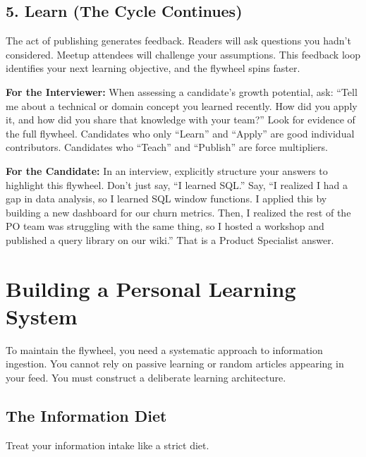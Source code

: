 \documentclass[
  11pt,
  openany,
  oneside]{book}
\renewenvironment{quote}{\begin{customquote}}{\end{customquote}}
\begin{document}
\subsection{5. Learn (The Cycle
Continues)}\label{learn-the-cycle-continues}

The act of publishing generates feedback. Readers will ask questions you
hadn't considered. Meetup attendees will challenge your assumptions.
This feedback loop identifies your next learning objective, and the
flywheel spins faster.

\begin{quote}
\textbf{For the Interviewer:} When assessing a candidate's growth
potential, ask: ``Tell me about a technical or domain concept you
learned recently. How did you apply it, and how did you share that
knowledge with your team?'' Look for evidence of the full flywheel.
Candidates who only ``Learn'' and ``Apply'' are good individual
contributors. Candidates who ``Teach'' and ``Publish'' are force
multipliers.
\end{quote}

\begin{quote}
\textbf{For the Candidate:} In an interview, explicitly structure your
answers to highlight this flywheel. Don't just say, ``I learned SQL.''
Say, ``I realized I had a gap in data analysis, so I learned SQL window
functions. I applied this by building a new dashboard for our churn
metrics. Then, I realized the rest of the PO team was struggling with
the same thing, so I hosted a workshop and published a query library on
our wiki.'' That is a Product Specialist answer.
\end{quote}

\bigskip

\section{Building a Personal Learning
System}\label{building-a-personal-learning-system}

To maintain the flywheel, you need a systematic approach to information
ingestion. You cannot rely on passive learning or random articles
appearing in your feed. You must construct a deliberate learning
architecture.

\subsection{The Information Diet}\label{the-information-diet}

Treat your information intake like a strict diet.
\end{document}
